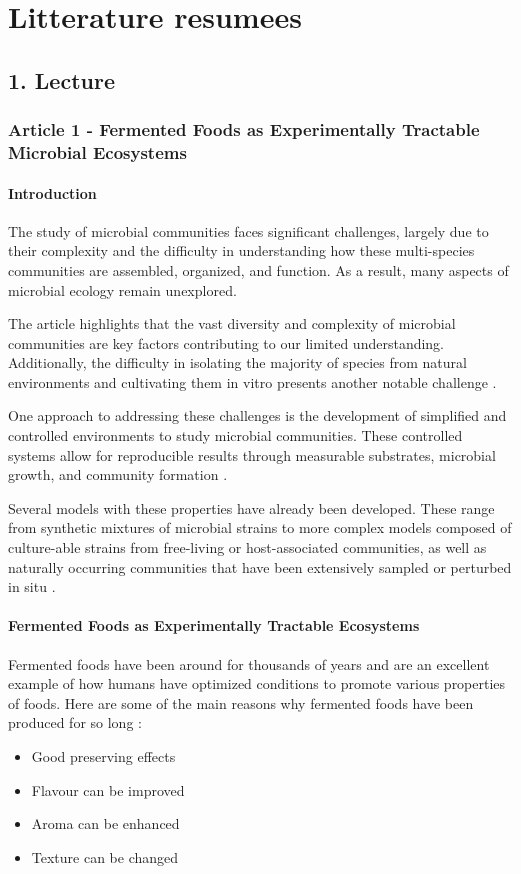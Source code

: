\chapter{Litterature resumees}

\section{1. Lecture}

\subsection{Article 1 - Fermented Foods as Experimentally Tractable Microbial Ecosystems}
\subsubsection*{Introduction}
The study of microbial communities faces significant challenges, largely due to their complexity and the difficulty in understanding how these multi-species communities are assembled, organized, and function. As a result, many aspects of microbial ecology remain unexplored.

The article highlights that the vast diversity and complexity of microbial communities are key factors contributing to our limited understanding. Additionally, the difficulty in isolating the majority of species from natural environments and cultivating them in vitro presents another notable challenge \cite*{L1-FermentedFoods}.

One approach to addressing these challenges is the development of simplified and controlled environments to study microbial communities. These controlled systems allow for reproducible results through measurable substrates, microbial growth, and community formation \cite*{L1-FermentedFoods}.

Several models with these properties have already been developed. These range from synthetic mixtures of microbial strains to more complex models composed of culture-able strains from free-living or host-associated communities, as well as naturally occurring communities that have been extensively sampled or perturbed in situ \cite*{L1-FermentedFoods}.

\subsubsection*{Fermented Foods as Experimentally Tractable Ecosystems}
Fermented foods have been around for thousands of years and are an excellent example of how humans have optimized conditions to promote various properties of foods. Here are some of the main reasons why fermented foods have been produced for so long \cite*{L1-FermentedFoods}:
\begin{highlight}
    \begin{itemize}
    \item Good preserving effects
    \item Flavour can be improved
    \item Aroma can be enhanced
    \item Texture can be changed
    \end{itemize}
\end{highlight}

